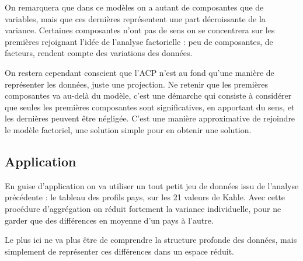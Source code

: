 \documentclass[
]{book}
\newenvironment{Shaded}{\begin{snugshade}}{\end{snugshade}}
\newcommand{\CommentTok}[1]{\textcolor[rgb]{0.56,0.35,0.01}{\textit{#1}}}
\newcommand{\DataTypeTok}[1]{\textcolor[rgb]{0.13,0.29,0.53}{#1}}
\newcommand{\KeywordTok}[1]{\textcolor[rgb]{0.13,0.29,0.53}{\textbf{#1}}}
\newcommand{\NormalTok}[1]{#1}
\newcommand{\OperatorTok}[1]{\textcolor[rgb]{0.81,0.36,0.00}{\textbf{#1}}}
\newcommand{\OtherTok}[1]{\textcolor[rgb]{0.56,0.35,0.01}{#1}}
\newcommand{\StringTok}[1]{\textcolor[rgb]{0.31,0.60,0.02}{#1}}
\begin{document}
On remarquera que dans ce modèles on a autant de composantes que de variables, mais que ces dernières représentent une part décroissante de la variance. Certaines composantes n'ont pas de sens on se concentrera sur les premières rejoignant l'idée de l'analyse factorielle : peu de composantes, de facteurs, rendent compte des variations des données.

On restera cependant conscient que l'ACP n'est au fond qu'une manière de représenter les données, juste une projection. Ne retenir que les premières composantes va au-delà du modèle, c'est une démarche qui consiste à considérer que seules les premières composantes sont significatives, en apportant du sens, et les dernières peuvent être négligée. C'est une manière approximative de rejoindre le modèle factoriel, une solution simple pour en obtenir une solution.

\hypertarget{application}{%
\subsection{Application}\label{application}}

En guise d'application on va utiliser un tout petit jeu de données issu de l'analyse précédente : le tableau des profils pays, sur les 21 valeurs de Kahle. Avec cette procédure d'aggrégation on réduit fortement la variance individuelle, pour ne garder que des différences en moyenne d'un pays à l'autre.

Le plus ici ne va plus être de comprendre la structure profonde des données, mais simplement de représenter ces différences dans un espace réduit.

\begin{Shaded}
\end{Shaded}
\end{document}
